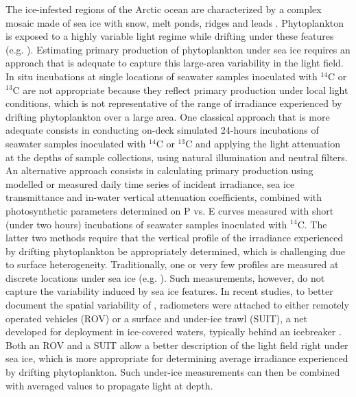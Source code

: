 The ice-infested regions of the Arctic ocean are characterized by a complex mosaic made of sea ice with snow, melt ponds, ridges and leads \citep{Nicolaus2013, Katlein2015, Katlein2016}. Phytoplankton is exposed to a highly variable light regime while drifting under these features (e.g. \citet{Lange2017}). Estimating primary production of phytoplankton under sea ice requires an approach that is adequate to capture this large-area variability in the light field. In situ incubations at single locations of seawater samples inoculated with $^{14}$C or $^{13}$C are not appropriate because they reflect primary production under local light conditions, which is not representative of the range of irradiance experienced by drifting phytoplankton over a large area. One classical approach that is more adequate consists in conducting on-deck simulated 24-hours incubations of seawater samples inoculated with $^{14}$C or $^{13}$C and applying the light attenuation at the depths of sample collections, using natural illumination and neutral filters. An alternative approach consists in calculating primary production using modelled or measured daily time series of incident irradiance, sea ice transmittance and in-water vertical attenuation coefficients, combined with photosynthetic parameters determined on P vs. E curves measured with short (under two hours) incubations of seawater samples inoculated with $^{14}$C. The latter two methods require that the vertical profile of the irradiance experienced by drifting phytoplankton be appropriately determined, which is challenging due to surface heterogeneity. Traditionally, one or very few \edz{} profiles are measured at discrete locations under sea ice (e.g. \citet{Mundy2009}). Such measurements, however, do not capture the variability induced by sea ice features. In recent studies, to better document the spatial variability of \edz{}, radiometers were attached to either remotely operated vehicles (ROV) \citep{Katlein2015} or a surface and under-ice trawl (SUIT), a net developed for deployment in ice-covered waters, typically behind an icebreaker \citep{Lange2017}. Both an ROV and a SUIT allow a better description of the light field right under sea ice, which is more appropriate for determining average irradiance experienced by drifting phytoplankton. Such under-ice measurements can then be combined with averaged \ked{} values to propagate light at depth.

